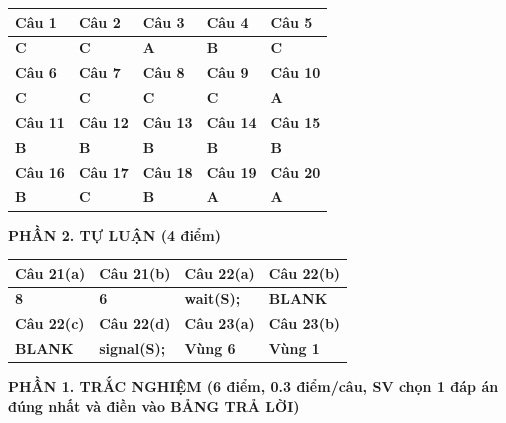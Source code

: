 \documentclass[11pt,a4paper]{article}
\begin{document}
\noindent
\begin{tabularx}{\textwidth}{|*{5}{>{\centering\arraybackslash}X|}}
\hline
\textbf{Câu 1} & \textbf{Câu 2} & \textbf{Câu 3} & \textbf{Câu 4} & \textbf{Câu 5} \\ \hline
\textbf{\color{blue}C} & \textbf{\color{blue}C} & \textbf{\color{blue}A} & \textbf{\color{blue}B} & \textbf{\color{blue}C} \\ \hline
\textbf{Câu 6} & \textbf{Câu 7} & \textbf{Câu 8} & \textbf{Câu 9} & \textbf{Câu 10} \\ \hline
\textbf{\color{blue}C} & \textbf{\color{blue}C} & \textbf{\color{blue}C} & \textbf{\color{blue}C} & \textbf{\color{blue}A} \\ \hline
\textbf{Câu 11} & \textbf{Câu 12} & \textbf{Câu 13} & \textbf{Câu 14} & \textbf{Câu 15} \\ \hline
\textbf{\color{blue}B} & \textbf{\color{blue}B} & \textbf{\color{blue}B} & \textbf{\color{blue}B} & \textbf{\color{blue}B} \\ \hline
\textbf{Câu 16} & \textbf{Câu 17} & \textbf{Câu 18} & \textbf{Câu 19} & \textbf{Câu 20} \\ \hline
\textbf{\color{blue}B} & \textbf{\color{blue}C} & \textbf{\color{blue}B} & \textbf{\color{blue}A} & \textbf{\color{blue}A} \\ \hline
\end{tabularx}

\vspace{0.3cm}
\noindent\textbf{PHẦN 2. TỰ LUẬN (4 điểm)}
\vspace{0.1cm}

\noindent
\begin{tabularx}{\textwidth}{|*{4}{>{\centering\arraybackslash}X|}}
\hline
\textbf{Câu 21(a)} & \textbf{Câu 21(b)} & \textbf{Câu 22(a)} & \textbf{Câu 22(b)} \\ \hline
\textbf{\color{blue}8} & \textbf{\color{blue}6} & \textbf{\color{blue}wait(S);} & \textbf{\color{blue}BLANK} \\ \hline
\textbf{Câu 22(c)} & \textbf{Câu 22(d)} & \textbf{Câu 23(a)} & \textbf{Câu 23(b)} \\ \hline
\textbf{\color{blue}BLANK} & \textbf{\color{blue}signal(S);} & \textbf{\color{blue}Vùng 6} & \textbf{\color{blue}Vùng 1} \\ \hline
\end{tabularx}

\newpage

\noindent\textbf{\large PHẦN 1. TRẮC NGHIỆM (6 điểm, 0.3 điểm/câu, SV chọn 1 đáp án đúng nhất và điền vào BẢNG TRẢ LỜI)}
\end{document}
